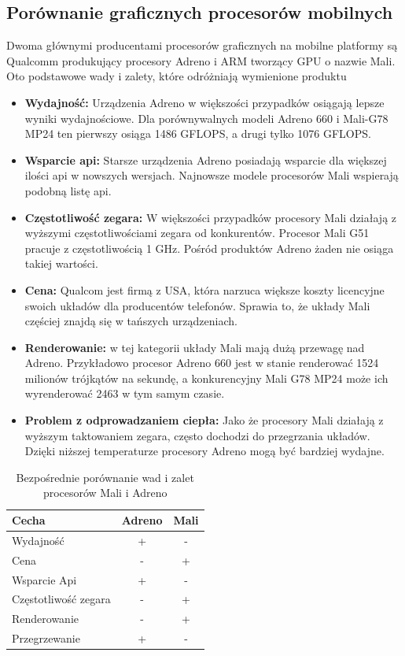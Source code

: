 \subsection[Porównanie graficznych procesorów mobilnych]{Porównanie graficznych procesorów mobilnych}
Dwoma głównymi producentami procesorów graficznych na mobilne platformy są Qualcomm produkujący procesory Adreno i ARM tworzący GPU o nazwie Mali. 
Oto podstawowe wady i zalety, które odróżniają wymienione produktu
\begin{itemize}
	\item \textbf{Wydajność:} Urządzenia Adreno w większości przypadków osiągają lepsze wyniki wydajnościowe. Dla porównywalnych modeli Adreno 660 i Mali-G78 MP24 ten pierwszy osiąga 1486 GFLOPS, a drugi tylko 1076 GFLOPS.
	\item \textbf{Wsparcie api:} Starsze urządzenia Adreno posiadają wsparcie dla większej ilości api w nowszych wersjach. Najnowsze modele procesorów Mali wspierają podobną listę api.
	\item \textbf{Częstotliwość zegara:} W większości przypadków procesory Mali działają z  wyższymi częstotliwościami zegara od konkurentów. Procesor Mali G51 pracuje z częstotliwością 1 GHz. Pośród produktów Adreno żaden nie osiąga takiej wartości.
	\item \textbf{Cena:} Qualcom jest firmą z USA, która narzuca większe koszty licencyjne swoich układów dla producentów telefonów. Sprawia to, że układy Mali częściej znajdą się w tańszych urządzeniach.
	\item \textbf{Renderowanie:} w tej kategorii układy Mali mają dużą przewagę nad Adreno. Przykładowo procesor Adreno 660 jest w stanie renderować 1524 milionów trójkątów na sekundę, a konkurencyjny Mali G78 MP24 może ich wyrenderować 2463 w tym samym czasie.
	\item \textbf{Problem z odprowadzaniem ciepła:} Jako że procesory Mali działają z wyższym taktowaniem zegara, często dochodzi do przegrzania układów. Dzięki niższej temperaturze procesory Adreno mogą być bardziej wydajne.
\end{itemize}
\begin{table}[H]
    \caption{Bezpośrednie porównanie wad i zalet procesorów Mali i Adreno}
    \label{tab:skale}
    \begin{tabular}{|l|c|c|}
\hline
\textbf{Cecha} & \textbf{Adreno} & \textbf{Mali}\\
\hline
Wydajność & + & -\\
\hline
Cena & - & + \\
\hline
Wsparcie Api & + & -\\
\hline
Częstotliwość zegara & - & +\\
\hline
Renderowanie & - & +\\
\hline
Przegrzewanie & + & -\\
\hline
\end{tabular}
\end{table}
	
